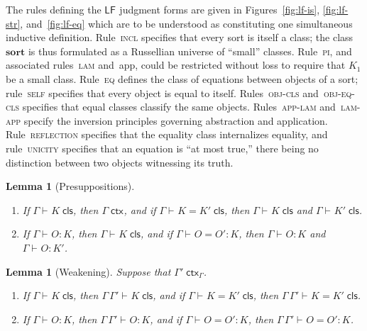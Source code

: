 \documentclass[11pt,twoside]{article}
\newtheorem{lemma}[theorem]{Lemma}
\newcommand{\LF}[1][]{\ensuremath{\mathsf{LF}_{#1}}}
\newcommand{\sortclass}{\ensuremath{\textbf{sort}}}
\newcommand{\isctx}[2][]{{#2}\;\mathsf{ctx}_{#1}}
\newcommand{\iscls}[3][]{{#2}\vdash_{#1}{#3}\;\mathsf{cls}}
\newcommand{\eqcls}[4][]{{#2}\vdash_{#1}{#3}={#4}\;\mathsf{cls}}
\newcommand{\isobj}[4][]{{#2}\vdash_{#1}{#3}:{#4}}
\newcommand{\eqobj}[5][]{{#2}\vdash_{#1}{#3}={#4}:{#5}}
\begin{document}
The rules defining the \LF{} judgment forms are given in Figures~\ref{fig:lf-is},
\ref{fig:lf-str}, and~\ref{fig:lf-eq} which are to be understood as constituting one
simultaneous inductive definition.  Rule~\textsc{incl} specifies that every sort is itself
a class; the class $\sortclass$ is thus formulated as a Russellian universe of ``small''
classes.  Rule~\textsc{pi}, and associated rules~\textsc{lam} and~\textsf{app}, could be
restricted without loss to require that $K_{1}$ be a small class.  Rule~\textsc{eq}
defines the class of equations between objects of a sort; rule~\textsc{self} specifies
that every object is equal to itself.  Rules~\textsc{obj-cls} and~\textsc{obj-eq-cls}
specifies that equal classes classify the same objects.  Rules~\textsc{app-lam}
and~\textsc{lam-app} specify the inversion principles governing abstraction and
application.  Rule~\textsc{reflection} specifies that the equality class internalizes
equality, and rule~\textsc{unicity} specifies that an equation is ``at most true,'' there
being no distinction between two objects witnessing its truth.

\begin{lemma}[Presuppositions]
  \label{lemma:presup}
  \begin{enumerate}
  \item If\/ $\iscls{\Gamma}{K}$, then $\isctx{\Gamma}$, and if\/ $\eqcls{\Gamma}{K}{K'}$, then $\iscls{\Gamma}{K}$
    and $\iscls{\Gamma}{K'}$.
  \item If\/ $\isobj{\Gamma}{O}{K}$, then $\iscls{\Gamma}{K}$, and if\/ $\eqobj{\Gamma}{O}{O'}{K}$, then
    $\isobj{\Gamma}{O}{K}$ and $\isobj{\Gamma}{O}{K'}$.
  \end{enumerate}
\end{lemma}

\begin{lemma}[Weakening]
  \label{lemma:weak}
  Suppose that $\isctx[\Gamma]{\Gamma'}$.
  \begin{enumerate}
  \item If\/ $\iscls{\Gamma}{K}$, then $\iscls{\Gamma\,\Gamma'}{K}$, and if\/ $\eqcls{\Gamma}{K}{K'}$, then $\eqcls{\Gamma\,\Gamma'}{K}{K'}$.
  \item If\/ $\isobj{\Gamma}{O}{K}$, then $\isobj{\Gamma\,\Gamma'}{O}{K}$, and if\/
    $\eqobj{\Gamma}{O}{O'}{K}$, then $\eqobj{\Gamma\,\Gamma'}{O}{O'}{K}$.
  \end{enumerate}
\end{lemma}
\end{document}
